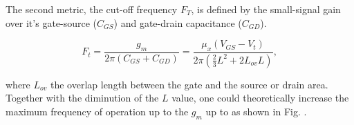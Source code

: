 

The second metric, the cut-off frequency $F_T$, is defined by the small-signal gain over it's gate-source ($C_{GS}$) and gate-drain capacitance ($C_{GD}$).

\begin{equation}
\label{eq:Ft}
F_t = \frac{g_m}{2\pi(C_{GS}+C_{GD})} = \frac{\mu_x(V_{GS}-V_t)}{2\pi (\frac{2}{3}L^2+2L_{ov}L)},
\end{equation}

where $L_{ov}$ the overlap length between the gate and the source or drain area.
Together with the diminution of the $L$ value, one could theoretically increase the maximum frequency of operation up to \Value the $g_m$ up to \Value as shown in Fig. \MFig.






